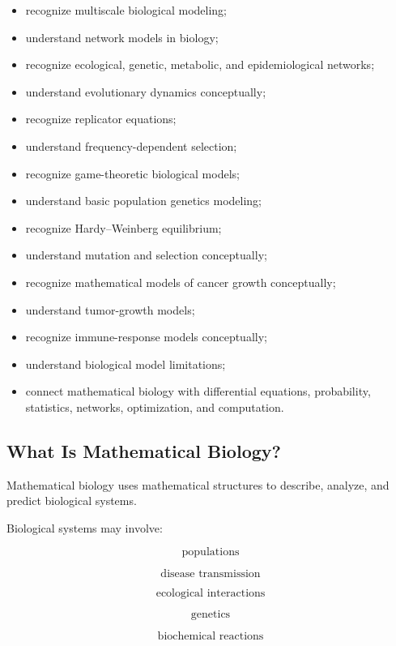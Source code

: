{\begin{itemize}
    \item recognize multiscale biological modeling;
    \item understand network models in biology;
    \item recognize ecological, genetic, metabolic, and epidemiological
          networks;
    \item understand evolutionary dynamics conceptually;
    \item recognize replicator equations;
    \item understand frequency-dependent selection;
    \item recognize game-theoretic biological models;
    \item understand basic population genetics modeling;
    \item recognize Hardy--Weinberg equilibrium;
    \item understand mutation and selection conceptually;
    \item recognize mathematical models of cancer growth conceptually;
    \item understand tumor-growth models;
    \item recognize immune-response models conceptually;
    \item understand biological model limitations;
    \item connect mathematical biology with differential equations,
          probability, statistics, networks, optimization, and computation.
\end{itemize}
}

\subsection{What Is Mathematical Biology?}
\label{subsec:what-is-mathematical-biology}

Mathematical biology uses mathematical structures to describe, analyze, and
predict biological systems.

Biological systems may involve:

\[
\boxed{
\text{populations}
}
\]

\[
\boxed{
\text{disease transmission}
}
\]

\[
\boxed{
\text{ecological interactions}
}
\]

\[
\boxed{
\text{genetics}
}
\]

\[
\boxed{
\text{biochemical reactions}
}
\]

